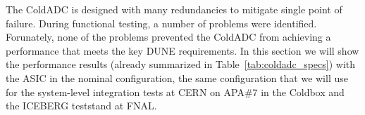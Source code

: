 \label{sec:4}


The ColdADC is designed with many redundancies to mitigate single point of failure. During functional testing, a number of 
problems were identified. Forunately, none of the problems prevented the ColdADC from achieving a performance that meets 
the key DUNE requirements. In this section we will show the performance results (already summarized 
in Table~\ref{tab:coldadc_specs}) with the ASIC in the nominal configuration, the same configuration that we will 
use for the system-level integration tests at CERN on APA\#7 in the Coldbox and the ICEBERG teststand at FNAL.
